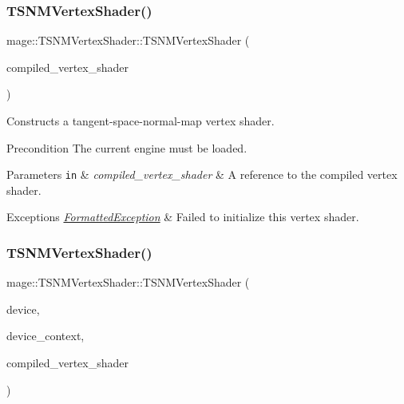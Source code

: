 \subsubsection{\texorpdfstring{T\+S\+N\+M\+Vertex\+Shader()}{TSNMVertexShader()}\hspace{0.1cm}{\footnotesize\ttfamily [3/6]}}
{\footnotesize\ttfamily mage\+::\+T\+S\+N\+M\+Vertex\+Shader\+::\+T\+S\+N\+M\+Vertex\+Shader (\begin{DoxyParamCaption}\item[{const \hyperlink{structmage_1_1_compiled_vertex_shader}{Compiled\+Vertex\+Shader} \&}]{compiled\+\_\+vertex\+\_\+shader }\end{DoxyParamCaption})\hspace{0.3cm}{\ttfamily [explicit]}}

Constructs a tangent-\/space-\/normal-\/map vertex shader.

\begin{DoxyPrecond}{Precondition}
The current engine must be loaded. 
\end{DoxyPrecond}

\begin{DoxyParams}[1]{Parameters}
\mbox{\tt in}  & {\em compiled\+\_\+vertex\+\_\+shader} & A reference to the compiled vertex shader. \\
\hline
\end{DoxyParams}

\begin{DoxyExceptions}{Exceptions}
{\em \hyperlink{structmage_1_1_formatted_exception}{Formatted\+Exception}} & Failed to initialize this vertex shader. \\
\hline
\end{DoxyExceptions}
\hypertarget{classmage_1_1_t_s_n_m_vertex_shader_a378092b8cd15d352f67a3c9a0cb6801c}{}\label{classmage_1_1_t_s_n_m_vertex_shader_a378092b8cd15d352f67a3c9a0cb6801c} 
\subsubsection{\texorpdfstring{T\+S\+N\+M\+Vertex\+Shader()}{TSNMVertexShader()}\hspace{0.1cm}{\footnotesize\ttfamily [4/6]}}
{\footnotesize\ttfamily mage\+::\+T\+S\+N\+M\+Vertex\+Shader\+::\+T\+S\+N\+M\+Vertex\+Shader (\begin{DoxyParamCaption}\item[{I\+D3\+D11\+Device2 $\ast$}]{device,  }\item[{I\+D3\+D11\+Device\+Context2 $\ast$}]{device\+\_\+context,  }\item[{const \hyperlink{structmage_1_1_compiled_vertex_shader}{Compiled\+Vertex\+Shader} \&}]{compiled\+\_\+vertex\+\_\+shader }\end{DoxyParamCaption})\hspace{0.3cm}{\ttfamily [explicit]}}

